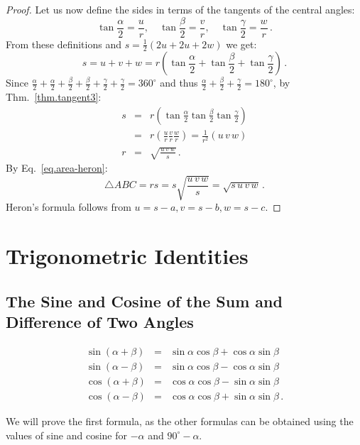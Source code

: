 \begin{proof}
Let us now define the sides in terms of the tangents of the central angles:
\begin{displaymath}
\tan \frac{\alpha}{2} = \frac{u}{r},\quad
\tan \frac{\beta}{2} = \frac{v}{r},\quad
\tan \frac{\gamma}{2} = \frac{w}{r}\,.
\end{displaymath}
From these definitions and $s=\frac{1}{2}(2u+2u+2w)$ we get:
\[
s = u+v+w = r\left(\tan \frac{\alpha}{2}+\tan \frac{\beta}{2}+\tan \frac{\gamma}{2}\right)\,.
\]
Since $\frac{\alpha}{2}+\frac{\alpha}{2}+\frac{\beta}{2}+\frac{\beta}{2}+\frac{\gamma}{2}+\frac{\gamma}{2}=360^\circ$ and thus $\frac{\alpha}{2}+\frac{\beta}{2}+\frac{\gamma}{2}=180^\circ$, by Thm.~\ref{thm.tangent3}:
\begin{eqnarray*}
s&=&r\left(\tan \frac{\alpha}{2}\tan \frac{\beta}{2}\tan \frac{\gamma}{2}\right)\\
&=&r\left(\frac{u}{r}\frac{v}{r}\frac{w}{r}\right)=\frac{1}{r^2}(u\,v\,w)\\
r&=&\sqrt{\displaystyle\frac{u\,v\,w}{s}}\,.
\end{eqnarray*}
By Eq.~\ref{eq.area-heron}:
\[
\triangle ABC=rs=s\sqrt{\displaystyle\frac{u\,v\,w}{s}}=\sqrt{s\,u\,v\,w}\,.
\]
Heron's formula follows from $u=s-a, v=s-b, w=s-c$.
\end{proof}

\section{Trigonometric Identities}\label{a.trig-identities}


\subsection{The Sine and Cosine of the Sum and Difference of Two Angles} \label{s.sum-of-trig}

\begin{theorem}\label{thm.sum-of-trig}
\begin{eqnarray*}
\sin(\alpha+\beta) &=& \sin\alpha\cos\beta + \cos\alpha\sin\beta\\
\sin(\alpha-\beta) &=& \sin\alpha\cos\beta - \cos\alpha\sin\beta\\
\cos(\alpha+\beta) &=& \cos\alpha\cos\beta - \sin\alpha\sin\beta\\
\cos(\alpha-\beta) &=& \cos\alpha\cos\beta + \sin\alpha\sin\beta\,.
\end{eqnarray*}
\end{theorem}
We will prove the first formula, as the other formulas can be obtained using the values of sine and cosine for $-\alpha$ and $90^\circ-\alpha$.

